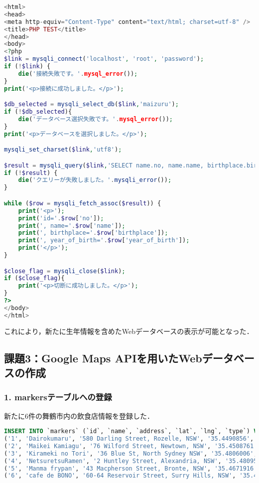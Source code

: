 \begin{lstlisting}[language=php]
<html>
<head>
<meta http-equiv="Content-Type" content="text/html; charset=utf-8" />
<title>PHP TEST</title>
</head>
<body>
<?php
$link = mysqli_connect('localhost', 'root', 'password');
if (!$link) {
    die('接続失敗です。'.mysql_error());
}
print('<p>接続に成功しました。</p>');

$db_selected = mysqli_select_db($link,'maizuru');
if (!$db_selected){
    die('データベース選択失敗です。'.mysql_error());
}
print('<p>データベースを選択しました。</p>');

mysqli_set_charset($link,'utf8');

$result = mysqli_query($link,'SELECT name.no, name.name, birthplace.birthplace, year_of_birth.year_of_birth FROM name INNER JOIN birthplace ON name.name = birthplace.name INNER JOIN year_of_birth ON name.name = year_of_birth.name');
if (!$result) {
    die('クエリーが失敗しました。'.mysqli_error());
}

while ($row = mysqli_fetch_assoc($result)) {
    print('<p>');
    print('id='.$row['no']);
    print(', name='.$row['name']);
    print(', birthplace='.$row['birthplace']);
    print(', year_of_birth='.$row['year_of_birth']);
    print('</p>');
}

$close_flag = mysqli_close($link);
if ($close_flag){
    print('<p>切断に成功しました。</p>');
}
?>
</body>
</html>
\end{lstlisting}

これにより，新たに生年情報を含めたWebデータベースの表示が可能となった．

\subsection*{課題3：Google Maps APIを用いたWebデータベースの作成}

\subsubsection*{1. markersテーブルへの登録}

新たに6件の舞鶴市内の飲食店情報を登録した．

\begin{lstlisting}[language=SQL]
INSERT INTO `markers` (`id`, `name`, `address`, `lat`, `lng`, `type`) VALUES
('1', 'Dairokumaru', '580 Darling Street, Rozelle, NSW', '35.4490856', '135.3105046', 'seafood'),
('2', 'Maikei Kamiagu', '76 Wilford Street, Newtown, NSW', '35.4508761', '135.3312693', 'seafood'),
('3', 'Kirameki no Tori', '36 Blue St, North Sydney NSW', '35.4806006', '135.4229714', 'ramen'),
('4', 'NetsuretsuRamen', '2 Huntley Street, Alexandria, NSW', '35.4809550', '135.4257069', 'ramen'),
('5', 'Manma frypan', '43 Macpherson Street, Bronte, NSW', '35.4671916', '135.3943122', 'cafe'),
('6', 'cafe de BONO', '60-64 Reservoir Street, Surry Hills, NSW', '35.4761566', '135.3901868', 'cafe');
\end{lstlisting}

